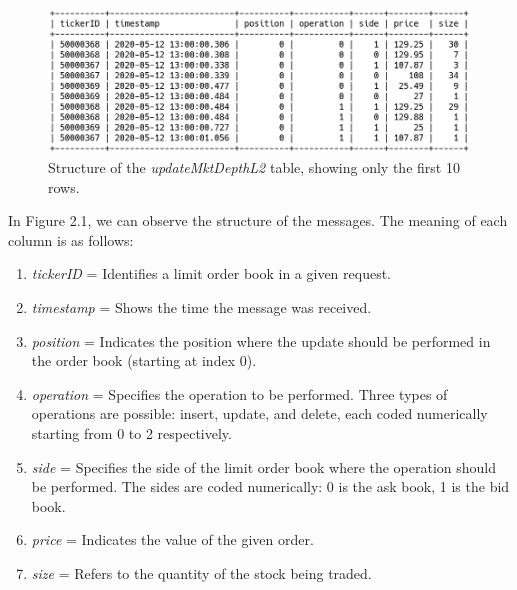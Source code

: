 \documentclass[a4paper,oneside,onecolumn,12pt]{LegrandOrangeBook}
\begin{document}
\begin{figure}[H]
\begin{center}
	\includegraphics[width=\linewidth]{kep/updateMktDepthL2.png}
	\caption{Structure of the \textit{updateMktDepthL2} table, showing only the first 10 rows.}
\end{center}
\end{figure}

In Figure 2.1, we can observe the structure of the messages. The meaning of each column is as follows:
\begin{enumerate}[noitemsep]
	\item \textit{tickerID} = Identifies a limit order book in a given request. 
	\item \textit{timestamp} = Shows the time the message was received. 
	\item \textit{position} = Indicates the position where the update should be performed in the order book (starting at index 0). 
	\item \textit{operation} = Specifies the operation to be performed. Three types of operations are possible: insert, update, and delete, each coded numerically starting from 0 to 2 respectively. 
	\item \textit{side} = Specifies the side of the limit order book where the operation should be performed. The sides are coded numerically: 0 is the ask book, 1 is the bid book. 
	\item \textit{price} = Indicates the value of the given order. 
	\item \textit{size} = Refers to the quantity of the stock being traded. 
\end{enumerate}
\end{document}
